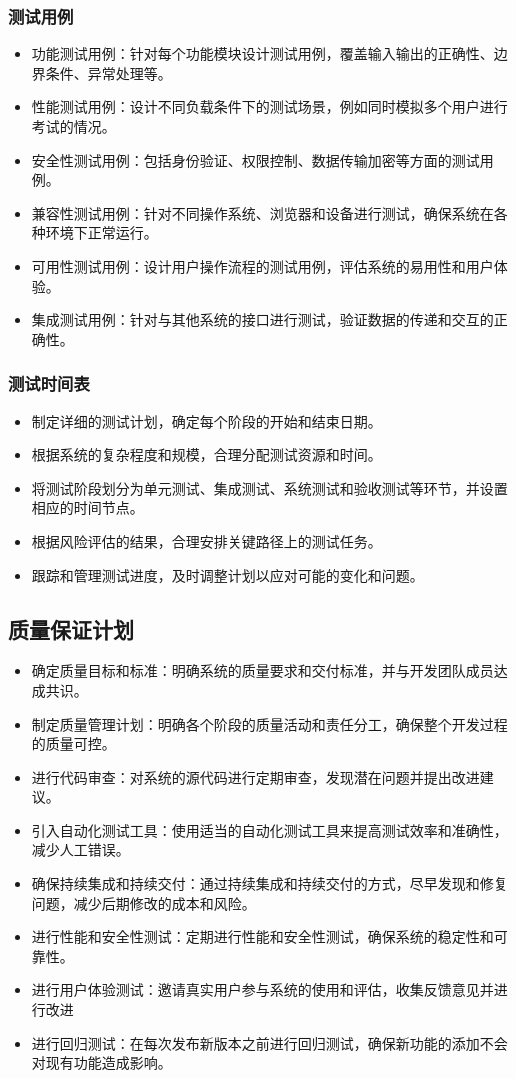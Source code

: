 \documentclass{article}
\begin{document}
\subsubsection{测试用例}
\begin{itemize}
	\item 功能测试用例：针对每个功能模块设计测试用例，覆盖输入输出的正确性、边界条件、异常处理等。
	\item 性能测试用例：设计不同负载条件下的测试场景，例如同时模拟多个用户进行考试的情况。
	\item 安全性测试用例：包括身份验证、权限控制、数据传输加密等方面的测试用例。
	\item 兼容性测试用例：针对不同操作系统、浏览器和设备进行测试，确保系统在各种环境下正常运行。
	\item 可用性测试用例：设计用户操作流程的测试用例，评估系统的易用性和用户体验。
	\item 集成测试用例：针对与其他系统的接口进行测试，验证数据的传递和交互的正确性。
\end{itemize}

\subsubsection{测试时间表}
\begin{itemize}
	\item 制定详细的测试计划，确定每个阶段的开始和结束日期。
	\item 根据系统的复杂程度和规模，合理分配测试资源和时间。
	\item 将测试阶段划分为单元测试、集成测试、系统测试和验收测试等环节，并设置相应的时间节点。
	\item 根据风险评估的结果，合理安排关键路径上的测试任务。
	\item 跟踪和管理测试进度，及时调整计划以应对可能的变化和问题。
\end{itemize}

\subsection{质量保证计划}
\begin{itemize}
	\item 确定质量目标和标准：明确系统的质量要求和交付标准，并与开发团队成员达成共识。
	\item 制定质量管理计划：明确各个阶段的质量活动和责任分工，确保整个开发过程的质量可控。
	\item 进行代码审查：对系统的源代码进行定期审查，发现潜在问题并提出改进建议。
	\item 引入自动化测试工具：使用适当的自动化测试工具来提高测试效率和准确性，减少人工错误。
	\item 确保持续集成和持续交付：通过持续集成和持续交付的方式，尽早发现和修复问题，减少后期修改的成本和风险。
	\item 进行性能和安全性测试：定期进行性能和安全性测试，确保系统的稳定性和可靠性。
	\item 进行用户体验测试：邀请真实用户参与系统的使用和评估，收集反馈意见并进行改进
	\item 进行回归测试：在每次发布新版本之前进行回归测试，确保新功能的添加不会对现有功能造成影响。
\end{itemize}
\end{document}
